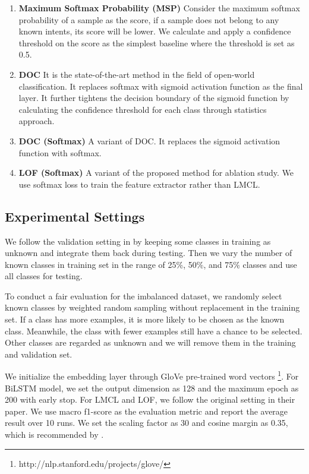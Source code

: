 \documentclass[11pt,a4paper]{article}
\begin{document}
\begin{enumerate}[noitemsep,topsep=0pt]
  \item \textbf{Maximum Softmax Probability (MSP)}  \cite{hendrycks2016baseline} Consider the maximum softmax probability of a sample as the score, if a sample does not belong to any known intents, its score will be lower. We calculate and apply a confidence threshold on the score as the simplest baseline where the threshold is set as 0.5. 
  \item \textbf{DOC} \cite{Shu2017DOCDO} 
It is the state-of-the-art method in the field of open-world classification. It replaces softmax with sigmoid activation function as the final layer. It further tightens the decision boundary of the sigmoid function by calculating the confidence threshold for each class through statistics approach.
  \item \textbf{DOC (Softmax)} A variant of DOC. It replaces the sigmoid activation function with softmax. 
  \item \textbf{LOF (Softmax)} A variant of the proposed method for ablation study. We use softmax loss to train the feature extractor rather than LMCL.
\end{enumerate}

\subsection{Experimental Settings}
We follow the validation setting in \cite{Fei2016BreakingTC, Shu2017DOCDO} by keeping some classes in training as unknown and integrate them back during testing. Then we vary the number of known classes in training set in the range of 25\%, 50\%, and 75\% classes and use all classes for testing. 

To conduct a fair evaluation for the imbalanced dataset, we randomly select known classes by weighted random sampling without replacement in the training set. If a class has more examples, it is more likely to be chosen as the known class. Meanwhile, the class with fewer examples still have a chance to be selected. Other classes are regarded as unknown and we will remove them in the training and validation set.

We initialize the embedding layer through GloVe \cite{pennington2014glove} pre-trained word vectors \footnote{http://nlp.stanford.edu/projects/glove/}. For BiLSTM model, we set the output dimension as 128 and the maximum epoch as 200 with early stop. For LMCL and LOF, we follow the original setting in their paper. We use macro f1-score as the evaluation metric and report the average result over 10 runs. We set the scaling factor  as 30 and cosine margin  as 0.35, which is recommended by \citet{wang2018additive}.
\end{document}

